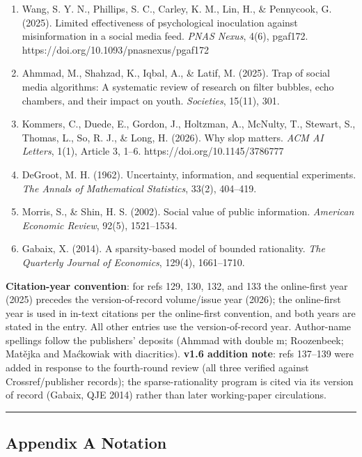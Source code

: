 \documentclass[
  11pt]{article}
\begin{document}
\begin{enumerate}
\item
  Wang, S. Y. N., Phillips, S. C., Carley, K. M., Lin, H., \& Pennycook,
  G. (2025). Limited effectiveness of psychological inoculation against
  misinformation in a social media feed. \emph{PNAS Nexus}, 4(6),
  pgaf172. https://doi.org/10.1093/pnasnexus/pgaf172
\item
  Ahmmad, M., Shahzad, K., Iqbal, A., \& Latif, M. (2025). Trap of
  social media algorithms: A systematic review of research on filter
  bubbles, echo chambers, and their impact on youth. \emph{Societies},
  15(11), 301.
\item
  Kommers, C., Duede, E., Gordon, J., Holtzman, A., McNulty, T.,
  Stewart, S., Thomas, L., So, R. J., \& Long, H. (2026). Why slop
  matters. \emph{ACM AI Letters}, 1(1), Article 3, 1--6.
  https://doi.org/10.1145/3786777
\item
  DeGroot, M. H. (1962). Uncertainty, information, and sequential
  experiments. \emph{The Annals of Mathematical Statistics}, 33(2),
  404--419.
\item
  Morris, S., \& Shin, H. S. (2002). Social value of public information.
  \emph{American Economic Review}, 92(5), 1521--1534.
\item
  Gabaix, X. (2014). A sparsity-based model of bounded rationality.
  \emph{The Quarterly Journal of Economics}, 129(4), 1661--1710.
\end{enumerate}

\textbf{Citation-year convention}: for refs 129, 130, 132, and 133 the
online-first year (2025) precedes the version-of-record volume/issue
year (2026); the online-first year is used in in-text citations per the
online-first convention, and both years are stated in the entry. All
other entries use the version-of-record year. Author-name spellings
follow the publishers' deposits (Ahmmad with double m; Roozenbeek;
Matějka and Maćkowiak with diacritics). \textbf{v1.6 addition note}:
refs 137--139 were added in response to the fourth-round review (all
three verified against Crossref/publisher records); the
sparse-rationality program is cited via its version of record (Gabaix,
QJE 2014) rather than later working-paper circulations.

\begin{center}\rule{0.5\linewidth}{0.5pt}\end{center}

\subsection{Appendix A Notation}\label{appendix-a-notation}
\end{document}
